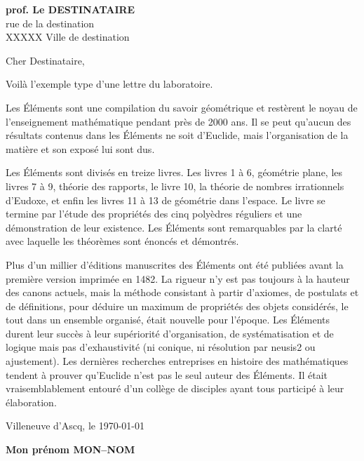 \documentclass[a4paper,11pt]{article}
\begin{document}
\pagestyle{empty}
\laboheader
\labofooter
\begin{destinataire}
\textbf{prof. Le DESTINATAIRE}\\
rue de la destination\\
XXXXX Ville de destination\\
\end{destinataire}


\hspace{4cm}Cher Destinataire,
\vspace{4mm}

{\setlength{\baselineskip}{1.2\baselineskip}
Voilà l'exemple type d'une lettre du laboratoire.

Les Éléments sont une compilation du savoir géométrique et restèrent le noyau de l'enseignement mathématique pendant près de 2000 ans. Il se peut qu'aucun des résultats contenus dans les Éléments ne soit d'Euclide, mais l'organisation de la matière et son exposé lui sont dus.

Les Éléments sont divisés en treize livres. Les livres 1 à 6, géométrie plane, les livres 7 à 9, théorie des rapports, le livre 10, la théorie de nombres irrationnels d'Eudoxe, et enfin les livres 11 à 13 de géométrie dans l'espace. Le livre se termine par l'étude des propriétés des cinq polyèdres réguliers et une démonstration de leur existence. Les Éléments sont remarquables par la clarté avec laquelle les théorèmes sont énoncés et démontrés.

Plus d'un millier d'éditions manuscrites des Éléments ont été publiées avant la première version imprimée en 1482. La rigueur n'y est pas toujours à la hauteur des canons actuels, mais la méthode consistant à partir d'axiomes, de postulats et de définitions, pour déduire un maximum de propriétés des objets considérés, le tout dans un ensemble organisé, était nouvelle pour l'époque. Les Éléments durent leur succès à leur supériorité d'organisation, de systématisation et de logique mais pas d'exhaustivité (ni conique, ni résolution par neusis2 ou ajustement). Les dernières recherches entreprises en histoire des mathématiques tendent à prouver qu'Euclide n'est pas le seul auteur des Éléments. Il était vraisemblablement entouré d'un collège de disciples ayant tous participé à leur élaboration.
}


\vspace{1cm}

Villeneuve d'Ascq, le \today

\begin{expediteur}
\textbf{Mon prénom MON--NOM}
\end{expediteur}
\end{document}
